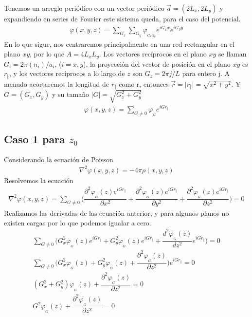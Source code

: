 \documentclass[a4paper,11pt,]{book}
\begin{document}
Tenemos un arreglo periódico con un vector periódico $\vec{a}= (2L_x,2L_y) $ y expandiendo en series de Fourier este sistema queda, para el caso del potencial.
\begin{eqnarray}
\varphi(x,y,z)= \displaystyle\sum_{G_x} \displaystyle\sum_{G_y} \varphi_{_{G_x G_y}} e^{iG_x x}e^{iG_y y}
\end{eqnarray}
En lo que sigue, nos centraremos principalmente en una red rectangular en el plano $xy$, por lo que $A = 4 L_x  L_y$. Los vectores recíprocos en el plano $xy$ se llaman $G_{i} = 2 \pi (n_i)/ a_i$, ($i= x,y$), la proyección del vector de posición en el plano $xy$ es $r_{\Vert}$, y los vectores recíprocos a lo largo de $z$ son $G_z = 2\pi j / L$ para entero j. A menudo acortaremos la longitud de $r_{\Vert}$ como r, entonces $\vec{r} = \vert {r_{\Vert} } \vert =\sqrt{x^2 + y^2} $. Y $G =(G_x, G_y) $ y su tamaño $ \vert G \vert =\sqrt{G^2_x+ G^2_y} $ 
\begin{eqnarray}
\varphi(x,y,z)= \displaystyle\sum_{G\neq 0}  \varphi_{_{G}} e^{iG r_{\Vert}}
\end{eqnarray}
\subsection{Caso 1 para $z_0$}
Considerando la ecuación de Poisson 
\begin{eqnarray}
\nabla^2 \varphi(x,y,z)= -4 \pi \rho(x,y,z)
\end{eqnarray}
Resolvemos la ecuación 
\begin{eqnarray}
\nabla^2 \varphi(x,y,z)= \displaystyle\sum_{G \neq 0} \Bigg(\dfrac{\partial^2 \varphi_{_{G}}(z)e^{iG r_{\Vert} }}{\partial x^2}+ \dfrac{\partial^2 \varphi_{_{G}}(z)e^{iG r_{\Vert}}}{\partial y^2}+\dfrac{\partial^2 \varphi_{_{G}}(z)e^{iG r_{\Vert}}}{\partial z^2} \Bigg)=0
\end{eqnarray}
Realizamos las derivadas de las ecuación anterior, y para algunos planos no existen cargas por lo que podemos igualar a cero.
\begin{eqnarray}
\displaystyle\sum_{G \neq 0} \Bigg(G^{2}_{x} \varphi_{_{G}}(z)e^{iG r_{\Vert}} + G^{2}_{y}\varphi_{_{G}}(z)e^{iG r_{\Vert}}+ \dfrac{d^2 \varphi_{_{G}}(z)}{d z^2} e^{iG r_{\Vert}} \Bigg)=0 \\
\displaystyle\sum_{G \neq 0} \Bigg(G^2_x \varphi_{_{G}}(z) + G^2_y\varphi_{_{G}}(z)+ \dfrac{\partial^2 \varphi_{_{G}}(z)}{\partial z^2} \Bigg)e^{iG r_{\Vert}}=0\\
(G^2_x + G^2_y)\varphi_{_{G}}(z)+ \dfrac{\partial^2 \varphi_{_{G}}(z)}{\partial z^2}=0\\
G^2\varphi_{_{G}}(z)+ \dfrac{\partial^2 \varphi_{_{G}}(z)}{\partial z^2}=0
\end{eqnarray}
\end{document}
